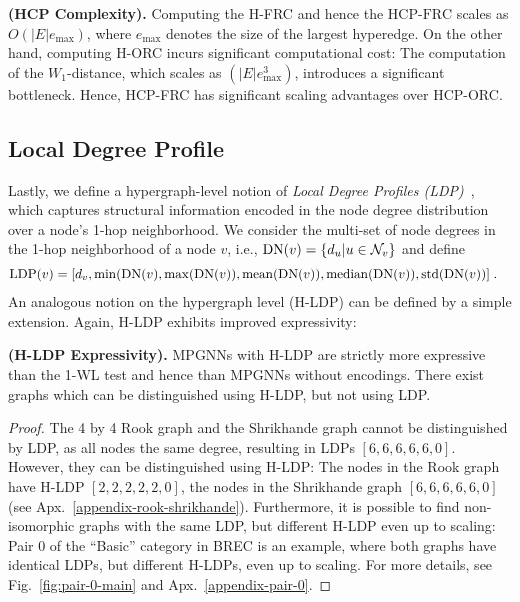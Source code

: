 \begin{rmk}\label{thm:lape_comp} \textbf{(HCP Complexity).} Computing the H-FRC and hence the $\text{HCP-FRC}$ scales as $O(|E|e_\text{max})$, where $e_\text{max}$ denotes the size of the largest hyperedge. On the other hand, computing H-ORC incurs significant computational cost: The computation of the $W_1$-distance, which scales as $(|E|e_\text{max}^3)$, introduces a significant bottleneck. Hence, HCP-FRC has significant scaling advantages over HCP-ORC.
\end{rmk} 




\subsection{Local Degree Profile}
Lastly, we define a hypergraph-level notion of \emph{Local Degree Profiles (LDP)}~\citep{cai2018simple}, which captures structural information encoded in the node degree distribution over a node's 1-hop neighborhood. We consider the multi-set of node degrees in the 1-hop neighborhood of a node $v$, i.e.,
${\rm DN}(v)=\{d_u|u\in \mathcal{N}_v\}$ and define
\begin{align*} \label{ldp}
\begin{split}
\text{LDP}(v) = [& d_v, \min(
{\rm DN}(v), \max({\rm DN}(v)),  {\rm mean}({\rm DN}(v)), {\rm median}({\rm DN}(v)), {\rm std} ({\rm DN}(v))] \; .
\end{split} 
\end{align*}
An analogous notion on the hypergraph level (H-LDP) can be defined by a simple extension. Again, H-LDP exhibits improved expressivity:\\

\begin{theorem}\label{thm:ldp_exp} \textbf{(H-LDP Expressivity).} MPGNNs with  H-LDP are strictly more expressive than the 1-WL test and hence than MPGNNs without encodings. There exist graphs which can be distinguished using H-LDP, but not using LDP.
\end{theorem}
%
\begin{proof}
    The 4 by 4 Rook graph and the Shrikhande graph cannot be distinguished by LDP, as all nodes the same degree, resulting in LDPs  $[6,6,6,6,6,0]$. However, they can be distinguished using H-LDP: The nodes in the Rook graph have H-LDP $[2, 2, 2, 2, 2, 0]$, the nodes in the Shrikhande graph $[6, 6, 6, 6, 6, 0]$ (see Apx.~\ref{appendix-rook-shrikhande}). Furthermore, it is possible to find non-isomorphic graphs with the same LDP, but different H-LDP even up to scaling: Pair 0 of the “Basic” category in BREC is an example, where both graphs have identical LDPs, but different H-LDPs, even up to scaling. For more details, see Fig.~\ref{fig:pair-0-main} and Apx.~\ref{appendix-pair-0}.
\end{proof}


